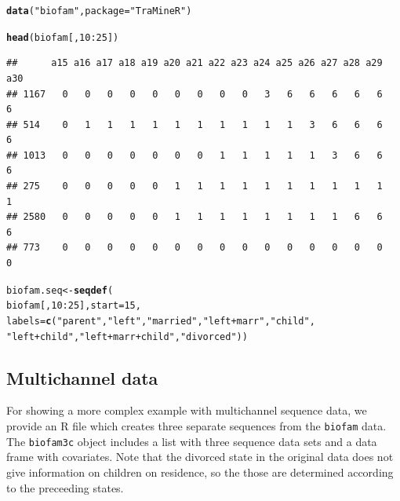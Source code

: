 \documentclass[12pt]{article}\usepackage[]{graphicx}\usepackage[]{color}
\makeatletter
\newcommand{\hlnum}[1]{\textcolor[rgb]{0.686,0.059,0.569}{#1}}%
\newcommand{\hlstr}[1]{\textcolor[rgb]{0.192,0.494,0.8}{#1}}%
\newcommand{\hlopt}[1]{\textcolor[rgb]{0,0,0}{#1}}%
\newcommand{\hlstd}[1]{\textcolor[rgb]{0.345,0.345,0.345}{#1}}%
\newcommand{\hlkwb}[1]{\textcolor[rgb]{0.69,0.353,0.396}{#1}}%
\newcommand{\hlkwc}[1]{\textcolor[rgb]{0.333,0.667,0.333}{#1}}%
\newcommand{\hlkwd}[1]{\textcolor[rgb]{0.737,0.353,0.396}{\textbf{#1}}}%
\newenvironment{kframe}{%
 \def\at@end@of@kframe{}%
 \ifinner\ifhmode%
  \def\at@end@of@kframe{\end{minipage}}%
  \begin{minipage}{\columnwidth}%
 \fi\fi%
 \def\FrameCommand##1{\hskip\@totalleftmargin \hskip-\fboxsep
 \colorbox{shadecolor}{##1}\hskip-\fboxsep
     \hskip-\linewidth \hskip-\@totalleftmargin \hskip\columnwidth}%
 \MakeFramed {\advance\hsize-\width
   \@totalleftmargin\z@ \linewidth\hsize
   \@setminipage}}%
 {\par\unskip\endMakeFramed%
 \at@end@of@kframe}
\newenvironment{knitrout}{}{} %
\makeatother
\begin{document}
\begin{knitrout}
\color{fgcolor}\begin{kframe}
\begin{alltt}
\hlkwd{data}\hlstd{(}\hlstr{"biofam"}\hlstd{,} \hlkwc{package} \hlstd{=} \hlstr{"TraMineR"}\hlstd{)}

\hlkwd{head}\hlstd{(biofam[,} \hlnum{10}\hlopt{:}\hlnum{25}\hlstd{])}
\end{alltt}
\begin{verbatim}
##      a15 a16 a17 a18 a19 a20 a21 a22 a23 a24 a25 a26 a27 a28 a29 a30
## 1167   0   0   0   0   0   0   0   0   0   3   6   6   6   6   6   6
## 514    0   1   1   1   1   1   1   1   1   1   1   3   6   6   6   6
## 1013   0   0   0   0   0   0   0   1   1   1   1   1   3   6   6   6
## 275    0   0   0   0   0   1   1   1   1   1   1   1   1   1   1   1
## 2580   0   0   0   0   0   1   1   1   1   1   1   1   1   6   6   6
## 773    0   0   0   0   0   0   0   0   0   0   0   0   0   0   0   0
\end{verbatim}
\begin{alltt}
\hlstd{biofam.seq} \hlkwb{<-} \hlkwd{seqdef}\hlstd{(}
  \hlstd{biofam[,} \hlnum{10}\hlopt{:}\hlnum{25}\hlstd{],} \hlkwc{start} \hlstd{=} \hlnum{15}\hlstd{,}
  \hlkwc{labels} \hlstd{=} \hlkwd{c}\hlstd{(}\hlstr{"parent"}\hlstd{,} \hlstr{"left"}\hlstd{,} \hlstr{"married"}\hlstd{,} \hlstr{"left+marr"}\hlstd{,} \hlstr{"child"}\hlstd{,}
             \hlstr{"left+child"}\hlstd{,} \hlstr{"left+marr+child"}\hlstd{,} \hlstr{"divorced"}\hlstd{))}
\end{alltt}
\end{kframe}
\end{knitrout}

\subsection{Multichannel data}
For showing a more complex example with multichannel sequence data, we provide an R file which creates three separate sequences from the \texttt{biofam} data. The \texttt{biofam3c} object includes a list with three sequence data sets and a data frame with covariates. Note that the divorced state in the original data does not give information on children on residence, so the those are determined according to the preceeding states.
\end{document}
